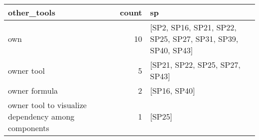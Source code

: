 \begin{tabular}{lrl}
\toprule
                                         other\_tools &  count &                                                           sp \\
\midrule
                                                 own &     10 &  [SP2, SP16, SP21, SP22, SP25, SP27, SP31, SP39, SP40, SP43] \\
                                          owner tool &      5 &                               [SP21, SP22, SP25, SP27, SP43] \\
                                       owner formula &      2 &                                                 [SP16, SP40] \\
 owner tool to visualize dependency among components &      1 &                                                       [SP25] \\
\bottomrule
\end{tabular}
